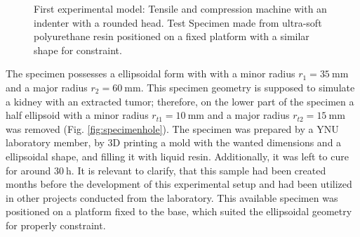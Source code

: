 \begin{figure}%
    \centering
   \qquad
   \caption{First experimental model: Tensile and compression machine with an indenter with a rounded head. Test Specimen made from ultra-soft polyurethane resin positioned on a fixed platform with a similar shape for constraint.}%
   \label{fig:firstexperiment}%
\end{figure}

The specimen possesses a ellipsoidal form with 
with a minor radius $r_1 = \SI{35}{\milli \m}$ and a major radius $r_2 = \SI{60}{\milli \m}$. 
This specimen geometry is supposed to simulate a kidney with an extracted tumor; therefore,
on the lower part of the specimen a half ellipsoid with a minor radius $r_{t1} = \SI{10}{\milli \m}$ 
and a major radius $r_{t2} = \SI{15}{\milli \m}$ was removed (Fig. \ref{fig:specimenhole}). 
The specimen was prepared by a YNU laboratory member, by 3D printing a mold with the wanted dimensions
 and a ellipsoidal shape, and filling it with liquid resin. 
 Additionally, it was left to cure for around $\SI{30}{\hour}$. It is relevant to clarify, that this 
 sample had been created months before the development of this experimental setup and 
 had been utilized in other projects conducted from the laboratory.
This available specimen was positioned on a platform fixed to the base, which suited 
the ellipsoidal geometry for properly constraint. 


